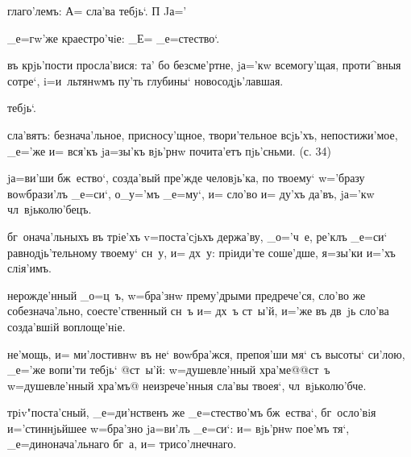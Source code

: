 
глаго'лемъ: А=%
сла'ва тебjь`. %
П%
Jа='%

_е=гw'же краестро'чiе: _Е=%
_е=стество`.



въ крjь'пости просла'вися: та' бо безсме'ртне, jа='кw 
всемогу'щая, проти^вныя сотре`, i=и~льтянwмъ пу'ть 
глубины` новосодjь'лавшая.

тебjь`.

сла'вятъ: безнача'льное, присносу'щное, твори'тельное 
всjь'хъ, непостижи'мое, _е='же и= вся'къ jа=зы'къ вjь'рнw 
почита'етъ пjь'сньми. (с. 34)

jа=ви'ши бж~ество`, созда'вый пре'жде человjь'ка, по 
твоему` w='бразу воwбрази'лъ _е=си`, о_у='мъ _е=му`, и= 
сло'во и= ду'хъ да'въ, jа='кw чл~вjьколю'бецъ.

бг~онача'льныхъ въ трiе'хъ v=поста'сjьхъ держа'ву, 
_о='ч~е, ре'клъ _е=си` равнодjь'тельному твоему` сн~у, и= 
дх~у: прiиди'те соше'дше, я=зы'ки и='хъ слiя'имъ.

нерожде'нный _о=ц~ъ, w=бра'знw прему'дрыми предрече'ся, 
сло'во же собезнача'льно, соесте'ственный сн~ъ и= дх~ъ 
ст~ы'й, и='же въ дв~jь сло'ва созда'вшiй воплоще'нiе.


не'мощь, и= ми'лостивнw въ не` воwбра'жся, препоя'ши мя` 
съ высоты` си'лою, _е='же вопи'ти тебjь` @ст~ы'й: 
w=душевле'нный хра'ме@{@ст~ъ w=душевле'нный хра'мъ@} 
неизрече'нныя сла'вы твоея`, чл~вjьколю'бче.

трiv"поста'сный, _е=ди'нственъ же _е=стество'мъ 
бж~ества`, бг~осло'вiя и='стиннjьйшее w=бра'зно jа=ви'лъ 
_е=си`: и= вjь'рнw пое'мъ тя`, _е=динонача'льнаго бг~а, 
и= трисо'лнечнаго.

